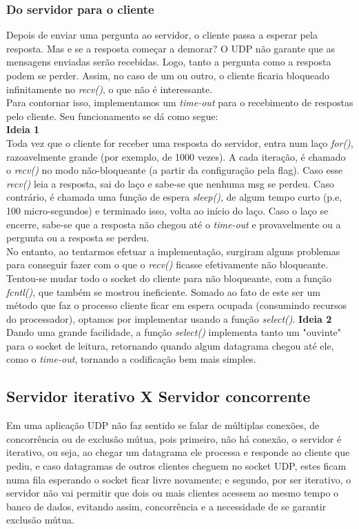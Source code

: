 \documentclass[11pt,twoside]{article}
\begin{document}
\subsubsection{Do servidor para o cliente}
Depois de enviar uma pergunta ao servidor, o cliente passa a esperar pela resposta. Mas e se a resposta começar a demorar? O UDP não garante que as mensagens enviadas serão recebidas. Logo, tanto a pergunta como a resposta podem se perder. Assim, no caso de um ou outro, o cliente ficaria bloqueado infinitamente no \textit{recv()}, o que não é interessante.\\
Para contornar isso, implementamos um \textit{time-out} para o recebimento de respostas pelo cliente. Seu funcionamento se dá como segue:\\
\textbf{Ideia 1}\\
Toda vez que o cliente for receber uma resposta do servidor, entra num laço \textit{for()}, razoavelmente grande (por exemplo, de 1000 vezes). A cada iteração, é chamado o \textit{recv()} no modo não-bloqueante (a partir da configuração pela flag). Caso esse \textit{recv()} leia a resposta, sai do laço e sabe-se que nenhuma msg se perdeu. Caso contrário, é chamada uma função de espera \textit{sleep()}, de algum tempo curto (p.e, 100 micro-segundos) e terminado isso, volta ao início do laço. Caso o laço se encerre, sabe-se que a resposta não chegou até o \textit{time-out} e provavelmente ou a pergunta ou a resposta se perdeu.\\
No entanto, ao tentarmos efetuar a implementação, surgiram alguns problemas para conseguir fazer com o que o \textit{recv()} ficasse efetivamente não bloqueante. Tentou-se mudar todo o socket do cliente para não bloqueante, com a função \textit{fcntl()}, que também se mostrou ineficiente. Somado ao fato de este ser um método que faz o processo cliente ficar em espera ocupada (consumindo recursos do processador), optamos por implementar usando a função \textit{select()}.
\textbf{Ideia 2}\\
Dando uma grande facilidade, a função \textit{select()} implementa tanto um "ouvinte" para o socket de leitura, retornando quando algum datagrama chegou até ele, como o \textit{time-out}, tornando a codificação bem mais simples.\\

\subsection{Servidor iterativo X Servidor concorrente}
Em uma aplicação UDP não faz sentido se falar de múltiplas conexões, de concorrência ou de exclusão mútua, pois primeiro, não há conexão, o servidor é iterativo, ou seja, ao chegar um datagrama ele processa e responde ao cliente que pediu, e caso datagramas de outros clientes cheguem no socket UDP, estes ficam numa fila esperando o socket ficar livre novamente; e segundo, por ser iterativo, o servidor não vai permitir que dois ou mais clientes acessem ao mesmo tempo o banco de dados, evitando assim, concorrência e a necessidade de se garantir exclusão mútua.\\
\end{document}
